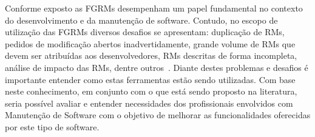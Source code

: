 Conforme exposto as FGRMs desempenham um papel fundamental no contexto do
desenvolvimento e da manutenção de software. Contudo, no escopo de utilização
das FGRMs diversos desafios se apresentam: duplicação de RMs, pedidos de
modificação abertos inadvertidamente, grande volume de RMs que devem ser
atribuídas aos desenvolvedores, RMs descritas de forma incompleta,
análise de impacto das RMs, dentre outros~\cite{cavalcanti2014challenges}.
Diante destes problemas e desafios é importante entender como estas ferramentas
estão sendo utilizadas. Com base neste conhecimento, em conjunto com o que está
sendo proposto na literatura, seria possível avaliar e entender necessidades dos
profissionais envolvidos com Manutenção de Software com o objetivo de melhorar
as funcionalidades oferecidas por este tipo de software.

%
%
%
%

